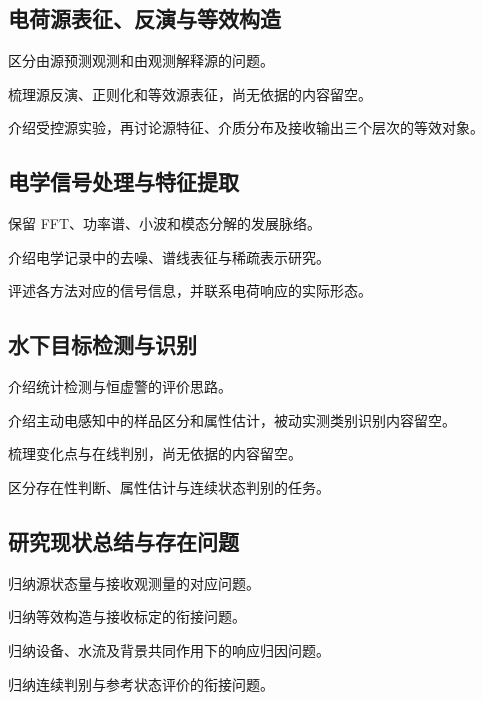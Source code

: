 \subsection{电荷源表征、反演与等效构造}
\begin{paragraphplan}
\item 区分由源预测观测和由观测解释源的问题。
\item 梳理源反演、正则化和等效源表征，尚无依据的内容留空。
\item 介绍受控源实验，再讨论源特征、介质分布及接收输出三个层次的等效对象。
\end{paragraphplan}
\subsection{电学信号处理与特征提取}
\begin{paragraphplan}
\item 保留 FFT、功率谱、小波和模态分解的发展脉络。
\item 介绍电学记录中的去噪、谱线表征与稀疏表示研究。
\item 评述各方法对应的信号信息，并联系电荷响应的实际形态。
\end{paragraphplan}
\subsection{水下目标检测与识别}
\begin{paragraphplan}
\item 介绍统计检测与恒虚警的评价思路。
\item 介绍主动电感知中的样品区分和属性估计，被动实测类别识别内容留空。
\item 梳理变化点与在线判别，尚无依据的内容留空。
\item 区分存在性判断、属性估计与连续状态判别的任务。
\end{paragraphplan}
\subsection{研究现状总结与存在问题}
\begin{paragraphplan}
\item 归纳源状态量与接收观测量的对应问题。
\item 归纳等效构造与接收标定的衔接问题。
\item 归纳设备、水流及背景共同作用下的响应归因问题。
\item 归纳连续判别与参考状态评价的衔接问题。
\end{paragraphplan}

